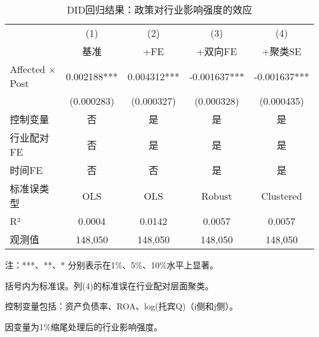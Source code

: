 \begin{table}[htbp]
\centering
\begin{threeparttable}
\caption{DID回归结果：政策对行业影响强度的效应}
\label{tab:did_main}
\begin{tabular}{lcccc}
\hline\hline
 & (1) & (2) & (3) & (4) \\
 & 基准 & +FE & +双向FE & +聚类SE \\
\hline
Affected $\times$ Post & 0.002188*** & 0.004312*** & -0.001637*** & -0.001637*** \\
 & (0.000283) & (0.000327) & (0.000328) & (0.000435) \\
\hline
控制变量 & 否 & 是 & 是 & 是 \\
行业配对FE & 否 & 是 & 是 & 是 \\
时间FE & 否 & 否 & 是 & 是 \\
标准误类型 & OLS & OLS & Robust & Clustered \\
R² & 0.0004 & 0.0142 & 0.0057 & 0.0057 \\
观测值 & 148,050 & 148,050 & 148,050 & 148,050 \\
\hline\hline
\end{tabular}
\begin{tablenotes}
\small
\item 注：***、**、* 分别表示在1\%、5\%、10\%水平上显著。
\item 括号内为标准误。列(4)的标准误在行业配对层面聚类。
\item 控制变量包括：资产负债率、ROA、log(托宾Q)（i侧和j侧）。
\item 因变量为1\%缩尾处理后的行业影响强度。
\end{tablenotes}
\end{threeparttable}
\end{table}